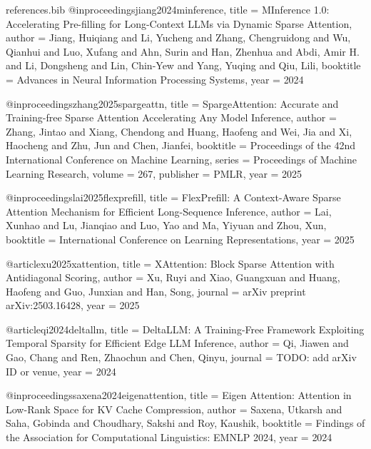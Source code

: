 \begin{filecontents}[overwrite]{references.bib}
@inproceedings{jiang2024minference,
  title     = {{MI}nference 1.0: Accelerating Pre-filling for Long-Context {LLMs} via Dynamic Sparse Attention},
  author    = {Jiang, Huiqiang and Li, Yucheng and Zhang, Chengruidong and Wu, Qianhui and
               Luo, Xufang and Ahn, Surin and Han, Zhenhua and Abdi, Amir H. and
               Li, Dongsheng and Lin, Chin-Yew and Yang, Yuqing and Qiu, Lili},
  booktitle = {Advances in Neural Information Processing Systems},
  year      = {2024}
}

@inproceedings{zhang2025spargeattn,
  title     = {{SpargeAttention}: Accurate and Training-free Sparse Attention Accelerating Any Model Inference},
  author    = {Zhang, Jintao and Xiang, Chendong and Huang, Haofeng and Wei, Jia and
               Xi, Haocheng and Zhu, Jun and Chen, Jianfei},
  booktitle = {Proceedings of the 42nd International Conference on Machine Learning},
  series    = {Proceedings of Machine Learning Research},
  volume    = {267},
  publisher = {PMLR},
  year      = {2025}
}

@inproceedings{lai2025flexprefill,
  title     = {{FlexPrefill}: A Context-Aware Sparse Attention Mechanism for Efficient Long-Sequence Inference},
  author    = {Lai, Xunhao and Lu, Jianqiao and Luo, Yao and Ma, Yiyuan and Zhou, Xun},
  booktitle = {International Conference on Learning Representations},
  year      = {2025}
}

@article{xu2025xattention,
  title   = {{XAttention}: Block Sparse Attention with Antidiagonal Scoring},
  author  = {Xu, Ruyi and Xiao, Guangxuan and Huang, Haofeng and Guo, Junxian and Han, Song},
  journal = {arXiv preprint arXiv:2503.16428},
  year    = {2025}
}


@article{qi2024deltallm,
  title   = {{DeltaLLM}: A Training-Free Framework Exploiting Temporal Sparsity for Efficient Edge {LLM} Inference},
  author  = {Qi, Jiawen and Gao, Chang and Ren, Zhaochun and Chen, Qinyu},
  journal = {TODO: add arXiv ID or venue},
  year    = {2024}
}


@inproceedings{saxena2024eigenattention,
  title     = {Eigen Attention: Attention in Low-Rank Space for {KV} Cache Compression},
  author    = {Saxena, Utkarsh and Saha, Gobinda and Choudhary, Sakshi and Roy, Kaushik},
  booktitle = {Findings of the Association for Computational Linguistics: {EMNLP} 2024},
  year      = {2024}
}


\end{filecontents}
